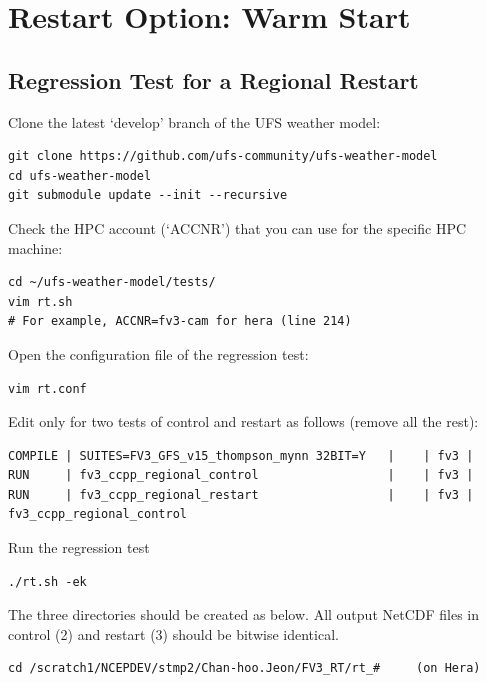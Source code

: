 \documentclass[11pt,fleqn]{report}              %
\begin{document}
\section{Restart Option: Warm Start}                 
\label{sec:workflow_restart}

\subsection{Regression Test for a Regional Restart}
\label{subsec:rt_restart_build}

Clone the latest `develop' branch of the UFS weather model:
\lstset{language=bash}   
\begin{lstlisting}[frame=trBL]
git clone https://github.com/ufs-community/ufs-weather-model
cd ufs-weather-model
git submodule update --init --recursive
\end{lstlisting}

Check the HPC account (`ACCNR') that you can use for the specific HPC machine:
\lstset{language=bash}   
\begin{lstlisting}[frame=trBL]
cd ~/ufs-weather-model/tests/
vim rt.sh
# For example, ACCNR=fv3-cam for hera (line 214)
\end{lstlisting}

Open the configuration file of the regression test:
\lstset{language=bash}   
\begin{lstlisting}[frame=trBL]
vim rt.conf
\end{lstlisting}

Edit only for two tests of control and restart as follows (remove all the rest):
\lstset{language=bash}   
\begin{lstlisting}[frame=trBL, basicstyle=\scriptsize]
COMPILE | SUITES=FV3_GFS_v15_thompson_mynn 32BIT=Y   |    | fv3 |
RUN     | fv3_ccpp_regional_control                  |    | fv3 |
RUN     | fv3_ccpp_regional_restart                  |    | fv3 | fv3_ccpp_regional_control
\end{lstlisting}

Run the regression test 
\lstset{language=bash}   
\begin{lstlisting}[frame=trBL]
./rt.sh -ek
\end{lstlisting}


The three directories should be created as below. All output NetCDF files in control (2) and restart (3) should be bitwise identical.
\lstset{language=bash}   
\begin{lstlisting}[frame=trBL]
cd /scratch1/NCEPDEV/stmp2/Chan-hoo.Jeon/FV3_RT/rt_#     (on Hera)
\end{lstlisting}
\end{document}
